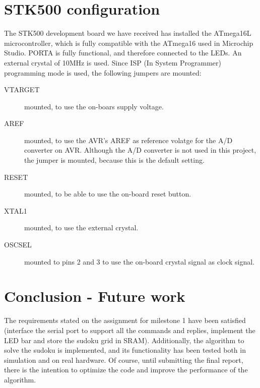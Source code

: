 \documentclass[12pt, a4, hidelinks]{article}
\begin{document}
\section*{STK500 configuration}
The STK500 development board we have received has installed the ATmega16L microcontroller, which is fully compatible with the ATmega16 used in Microchip Studio. PORTA is fully functional, and therefore connected to the LEDs. An external crystal of 10MHz is used. Since ISP (In System Programmer) programming mode is used, the following jumpers are mounted:
\begin{description}
\item[VTARGET] mounted, to use the on-boars supply voltage.
\item[AREF] mounted, to use the AVR's AREF as reference volatge for the A/D converter on AVR. Although the A/D converter is not used in this project, the jumper is mounted, because this is the default setting.
\item[RESET] mounted, to be able to use the on-board reset button.
\item[XTAL1] mounted, to use the external crystal.
\item[OSCSEL] mounted to pins 2 and 3 to use the on-board crystal signal as clock signal.
\end{description}

\section*{Conclusion - Future work}
The requirements stated on the assignment for milestone 1 have been satisfied (interface the serial port to support all the commands and replies, implement the LED bar and store the sudoku grid in SRAM). Additionally, the algorithm to solve the sudoku is implemented, and its functionality has been tested both in simulation and on real hardware. Of course, until submitting the final report, there is the intention to optimize the code and improve the performance of the algorithm.
\end{document}
